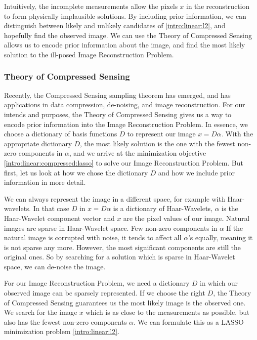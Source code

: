 Intuitively, the incomplete measurements allow the pixels $x$ in the reconstruction to form physically implausible solutions. By including prior information, we can distinguish between likely and unlikely candidates of \eqref{intro:linear:l2}, and hopefully find the observed image. We can use the Theory of Compressed Sensing allows us to encode prior information about the image, and find the most likely solution to the ill-posed Image Reconstruction Problem.

\subsubsection{Theory of Compressed Sensing}
Recently, the Compressed Sensing sampling theorem has emerged\cite{candes2006robust, donoho2006compressed}, and has applications in data compression, de-noising\cite{zhu2009new}, and image reconstruction. For our intends and purposes, the Theory of Compressed Sensing gives us a way to encode prior information into the Image Reconstruction Problem. In essence, we choose a dictionary of basis functions $D$ to represent our image $x = D\alpha$. With the appropriate dictionary $D$, the most likely solution is the one with the fewest non-zero components in $\alpha$, and we arrive at the minimization objective \eqref{intro:linear:compressed:lasso} to solve our Image Reconstruction Problem. But first, let us look at how we chose the dictionary $D$ and how we include prior information in more detail.

We can always represent the image in a different space, for example with Haar-wavelets. In that case $D$ in $x = D\alpha$ is a dictionary of Haar-Wavelets, $\alpha$ is the Haar-Wavelet component vector and $x$ are the pixel values of our image. 
Natural images are sparse in Haar-Wavelet space. Few non-zero components in $\alpha$
If the natural image is corrupted with noise, it tends to affect all $\alpha$'s equally, meaning it is not sparse any more. However, the most significant components are still the original ones. So by searching for a solution which is sparse in Haar-Wavelet space, we can de-noise the image.

For our Image Reconstruction Problem, we need a dictionary $D$ in which our observed image can be sparsely represented.
If we choose the right $D$, the Theory of Compressed Sensing guarantees us the most likely image is the observed one.
We search for the image $x$ which is as close to the measurements as possible, but also has the fewest non-zero components $\alpha$. We can formulate this as a LASSO minimization problem \eqref{intro:linear:l2}.

